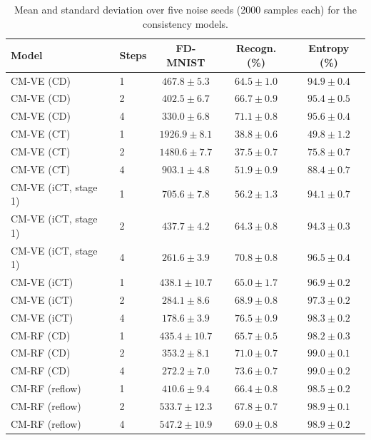 \documentclass{article}
\begin{document}
\begin{table}[!htbp]
  \caption{Mean and standard deviation over five noise seeds (2000 samples each)
  for the consistency models.}
  \label{tab:variability}
  \centering
  \footnotesize
  \begin{tabular}{llccc}
    \toprule
    Model & Steps & FD-MNIST & Recogn. (\%) & Entropy (\%) \\
    \midrule
    CM-VE (CD) & 1 & $467.8 \pm 5.3$ & $64.5 \pm 1.0$ & $94.9 \pm 0.4$ \\
    CM-VE (CD) & 2 & $402.5 \pm 6.7$ & $66.7 \pm 0.9$ & $95.4 \pm 0.5$ \\
    CM-VE (CD) & 4 & $330.0 \pm 6.8$ & $71.1 \pm 0.8$ & $95.6 \pm 0.4$ \\
    \midrule
    CM-VE (CT) & 1 & $1926.9 \pm 8.1$ & $38.8 \pm 0.6$ & $49.8 \pm 1.2$ \\
    CM-VE (CT) & 2 & $1480.6 \pm 7.7$ & $37.5 \pm 0.7$ & $75.8 \pm 0.7$ \\
    CM-VE (CT) & 4 & $903.1 \pm 4.8$ & $51.9 \pm 0.9$ & $88.4 \pm 0.7$ \\
    \midrule
    CM-VE (iCT, stage 1) & 1 & $705.6 \pm 7.8$ & $56.2 \pm 1.3$ & $94.1 \pm 0.7$ \\
    CM-VE (iCT, stage 1) & 2 & $437.7 \pm 4.2$ & $64.3 \pm 0.8$ & $94.3 \pm 0.3$ \\
    CM-VE (iCT, stage 1) & 4 & $261.6 \pm 3.9$ & $70.8 \pm 0.8$ & $96.5 \pm 0.4$ \\
    \midrule
    CM-VE (iCT) & 1 & $438.1 \pm 10.7$ & $65.0 \pm 1.7$ & $96.9 \pm 0.2$ \\
    CM-VE (iCT) & 2 & $284.1 \pm 8.6$ & $68.9 \pm 0.8$ & $97.3 \pm 0.2$ \\
    CM-VE (iCT) & 4 & $178.6 \pm 3.9$ & $76.5 \pm 0.9$ & $98.3 \pm 0.2$ \\
    \midrule
    CM-RF (CD) & 1 & $435.4 \pm 10.7$ & $65.7 \pm 0.5$ & $98.2 \pm 0.3$ \\
    CM-RF (CD) & 2 & $353.2 \pm 8.1$ & $71.0 \pm 0.7$ & $99.0 \pm 0.1$ \\
    CM-RF (CD) & 4 & $272.2 \pm 7.0$ & $73.6 \pm 0.7$ & $99.0 \pm 0.2$ \\
    \midrule
    CM-RF (reflow) & 1 & $410.6 \pm 9.4$ & $66.4 \pm 0.8$ & $98.5 \pm 0.2$ \\
    CM-RF (reflow) & 2 & $533.7 \pm 12.3$ & $67.8 \pm 0.7$ & $98.9 \pm 0.1$ \\
    CM-RF (reflow) & 4 & $547.2 \pm 10.9$ & $69.0 \pm 0.8$ & $98.9 \pm 0.2$ \\
    \bottomrule
  \end{tabular}
\end{table}
\end{document}
